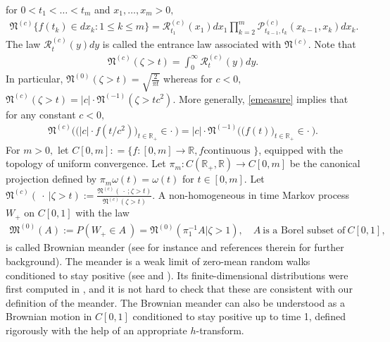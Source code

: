 \documentclass[12pt]{amsart}
\begin{document}
for $0<t_1<\ldots <t_m$ and $x_1,\ldots,x_m>0,$ \begin{eqnarray}
\label{emeasure} {{\mathfrak N}}^{(c)}\{f(t_k)\in dx_k:1\leq k\leq
m\}={{\mathcal R}}_{t_1}^{(c)}(x_1)dx_1\prod_{k=2}^m
{{\mathcal P}}_{t_{k-1},t_k}^{(c)}(x_{k-1},x_k)dx_k. \end{eqnarray} The law
${{\mathcal R}}_t^{(c)}(y)dy$ is called the entrance law associated with
${{\mathfrak N}}^{(c)}.$ Note that \begin{eqnarray} \label{duration}
{{\mathfrak N}}^{(c)}(\zeta>t)=\int_0^\infty {{\mathcal R}}^{(c)}_t(y)dy. \end{eqnarray} In
particular, ${{\mathfrak N}}^{(0)}(\zeta>t)=\sqrt{{\frac {\displaystyle {2}}{\displaystyle {\pi t} }}}$ whereas for
$c<0,$ ${{\mathfrak N}}^{(c)}(\zeta>t)=|c|\cdot {{\mathfrak N}}^{(-1)}(\zeta>tc^2).$ More
generally, \eqref{emeasure} implies that for any constant $c<0,$
\begin{eqnarray} \label{scaling} {{\mathfrak N}}^{(c)}\bigl(\bigl(|c|\cdot
f(t/c^2)\bigr)_{t\in {{\mathbb R}}_+}\in \cdot~\bigr)=|c|\cdot
{{\mathfrak N}}^{(-1)}\bigl( \bigl(f(t)\bigr)_{t\in {{\mathbb R}}_+}\in \cdot~\bigr).
\end{eqnarray} For $m>0,$ let $C[0,m] : = \{ f : [0,m] \to {{\mathbb R}}, f \mbox{
continuous } \}$, equipped with the topology of uniform convergence.
Let $\pi_m:C({{\mathbb R}}_+,{{\mathbb R}})\to C[0,m]$ be the canonical projection
defined by $\pi_m \omega(t)=\omega(t)$ for $t\in [0,m].$ Let
${{\mathfrak N}}^{(c)}(~\cdot~|\zeta>t):={\frac {\displaystyle {{{\mathfrak N}}^{(c)}(~\cdot~;\zeta>t)}}{\displaystyle {{{\mathfrak N}}^{(c)}(\zeta>t)} }}.$
A non-homogeneous in time Markov process $W_+$ on $C[0,1]$ with the
law \begin{eqnarray*} {{\mathfrak M}}^{(0)}(A):=P(W_+\in A~)={{\mathfrak N}}^{(0)}(\pi^{-1}_1 A| \zeta
>1), \quad A~\mbox{is a Borel subset of}~C[0,1], \end{eqnarray*} is called
Brownian meander (see for instance \cite{bertoin,miller} and
references therein for further background). The meander is a weak
limit of zero-mean random walks conditioned to stay positive (see
\cite{bolthausen,iglehart} and \cite{doney}). Its finite-dimensional
distributions were first computed in \cite{belkin}, and it is not
hard to check that these are consistent with our definition of the
meander. The Brownian meander can also be understood as a Brownian
motion in $C[0,1]$ conditioned to stay positive up to time 1,
defined rigorously with the help of an appropriate $h$-transform.
\par
\end{document}
